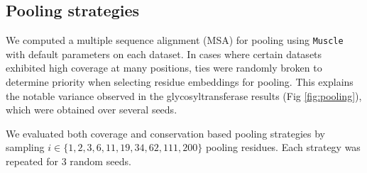 \subsection{Pooling strategies}

We computed a multiple sequence alignment (MSA) for pooling using \texttt{Muscle} with default parameters on each dataset. In cases where certain datasets exhibited high coverage at many positions, ties were randomly broken to determine priority when selecting residue embeddings for pooling. This explains the notable variance observed in the glycosyltransferase results (Fig \ref{fig:pooling}), which were obtained over several seeds.

We evaluated both coverage and conservation based pooling strategies by sampling $i \in \{1,2,3,6,11,19,34,62,111,200\}$ pooling residues. Each strategy was repeated for 3 random seeds.